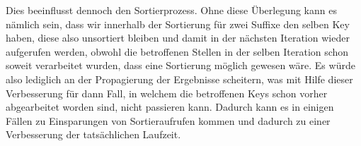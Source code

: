 Dies beeinflusst dennoch den Sortierprozess. Ohne diese Überlegung kann es nämlich sein, dass wir innerhalb der Sortierung für zwei Suffixe den selben Key haben, diese also unsortiert bleiben und damit in der nächsten Iteration wieder aufgerufen werden, obwohl die betroffenen Stellen in der selben Iteration schon soweit verarbeitet wurden, dass eine Sortierung möglich gewesen wäre. Es würde also lediglich an der Propagierung der Ergebnisse scheitern, was mit Hilfe dieser Verbesserung für dann Fall, in welchem die betroffenen Keys schon vorher abgearbeitet worden sind, nicht passieren kann. Dadurch kann es in einigen Fällen zu Einsparungen von Sortieraufrufen kommen und dadurch zu einer Verbesserung der tatsächlichen Laufzeit.
